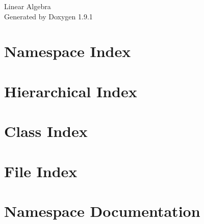 \let\mypdfximage\pdfximage\def\pdfximage{\immediate\mypdfximage}\documentclass[twoside]{book}
\newcommand{\+}{\discretionary{\mbox{\scriptsize$\hookleftarrow$}}{}{}}
\newcommand{\clearemptydoublepage}{%
  \newpage{\pagestyle{empty}\cleardoublepage}%
}
\begin{document}
\raggedbottom

\hypersetup{pageanchor=false,
             bookmarksnumbered=true,
             pdfencoding=unicode
            }
\begin{titlepage}
\vspace*{7cm}
\begin{center}%
{\Large Linear Algebra }\\
\vspace*{1cm}
{\large Generated by Doxygen 1.9.1}\\
\end{center}
\end{titlepage}
\clearemptydoublepage
{}
\tableofcontents
\clearemptydoublepage
{}
\hypersetup{pageanchor=true}

\chapter{Namespace Index}

\chapter{Hierarchical Index}

\chapter{Class Index}

\chapter{File Index}

\chapter{Namespace Documentation}







\end{document}
